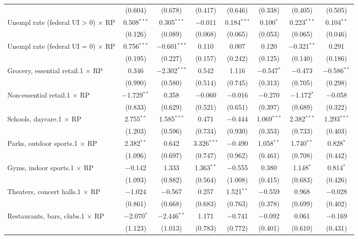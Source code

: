 \begin{table}[!htbp]
\begin{tabular}{@{\extracolsep{5pt}}lccccccc}
  & (0.604) & (0.678) & (0.417) & (0.646) & (0.338) & (0.405) & (0.505) \\ 
  Unempl rate (federal UI > 0) $\times$ RP & 0.508$^{***}$ & 0.305$^{***}$ & $-$0.011 & 0.184$^{***}$ & 0.100$^{*}$ & 0.223$^{***}$ & 0.104$^{**}$ \\ 
  & (0.126) & (0.089) & (0.068) & (0.065) & (0.053) & (0.065) & (0.046) \\ 
  Unempl rate (federal UI = 0) $\times$ RP & 0.756$^{***}$ & $-$0.601$^{***}$ & 0.110 & 0.007 & 0.120 & $-$0.321$^{**}$ & 0.291 \\ 
  & (0.195) & (0.227) & (0.157) & (0.242) & (0.125) & (0.140) & (0.186) \\ 
  Grocery, essential retail.1 $\times$ RP & 0.346 & $-$2.302$^{***}$ & 0.542 & 1.116 & $-$0.547$^{*}$ & $-$0.473 & $-$0.586$^{**}$ \\ 
  & (0.990) & (0.580) & (0.514) & (0.745) & (0.313) & (0.705) & (0.298) \\ 
  Non-essential retail.1 $\times$ RP & $-$1.729$^{**}$ & 0.358 & $-$0.060 & $-$0.016 & $-$0.270 & $-$1.172$^{*}$ & $-$0.058 \\ 
  & (0.833) & (0.629) & (0.521) & (0.651) & (0.397) & (0.689) & (0.322) \\ 
  Schools, daycare.1 $\times$ RP & 2.755$^{**}$ & 1.585$^{***}$ & 0.471 & $-$0.444 & 1.069$^{***}$ & 2.382$^{***}$ & 1.293$^{***}$ \\ 
  & (1.203) & (0.596) & (0.734) & (0.930) & (0.353) & (0.733) & (0.403) \\ 
  Parks, outdoor sports.1 $\times$ RP & 2.382$^{**}$ & 0.642 & 3.326$^{***}$ & $-$0.490 & 1.058$^{**}$ & 1.740$^{**}$ & 0.828$^{*}$ \\ 
  & (1.096) & (0.697) & (0.747) & (0.962) & (0.461) & (0.708) & (0.442) \\ 
  Gyms, indoor sports.1 $\times$ RP & $-$0.142 & 1.333 & 1.363$^{**}$ & $-$0.555 & 0.380 & 1.148$^{*}$ & 0.814$^{*}$ \\ 
  & (1.093) & (0.882) & (0.564) & (1.008) & (0.415) & (0.683) & (0.426) \\ 
  Theaters, concert halls.1 $\times$ RP & $-$1.024 & $-$0.567 & 0.257 & 1.521$^{**}$ & $-$0.559 & 0.968 & $-$0.028 \\ 
  & (0.861) & (0.668) & (0.683) & (0.763) & (0.378) & (0.699) & (0.402) \\ 
  Restaurants, bars, clubs.1 $\times$ RP & $-$2.070$^{*}$ & $-$2.446$^{**}$ & 1.171 & $-$0.741 & $-$0.092 & 0.061 & $-$0.169 \\ 
  & (1.123) & (1.013) & (0.783) & (0.772) & (0.401) & (0.610) & (0.431) \\ 

\end{tabular}
\end{table}
